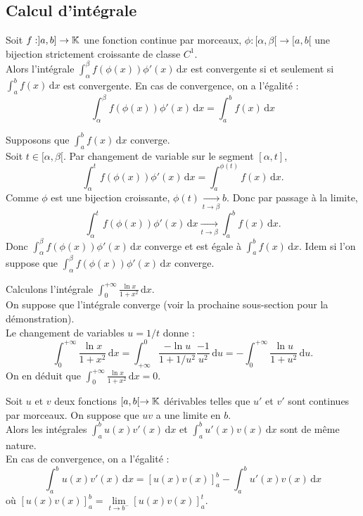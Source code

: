 \documentclass{book}
\begin{document}
\subsection{Calcul d'intégrale}
\begin{Theoreme}
Soit $f:]a,b]\to \mathbb{K} $ une fonction continue par morceaux, $\phi:[\alpha,\beta[\to  [a,b[$ une bijection strictement croissante de classe $C^1$.\\
Alors l'intégrale
$\int_\alpha^\beta f(\phi(x))\phi'(x)\,\mathrm dx $ est convergente si et seulement si $\int_a^b f(x)\,\mathrm dx$ est convergente. En cas de convergence, on a l'égalité :
$$\int_\alpha^\beta f(\phi(x))\phi'(x)\,\mathrm dx =\int_a^b f(x)\,\mathrm dx$$
\end{Theoreme}
\begin{Demonstration}
Supposons que $\int_a^b f(x)\,\mathrm dx$ converge.\\
Soit $t\in[\alpha,\beta[.$ Par changement de variable sur le
segment $[\alpha , t]$, 
$$\int_\alpha^t f(\phi(x))\phi'(x)\,\mathrm dx =\int_a^{\phi(t)} f(x)\,\mathrm dx.$$
Comme $\phi$ est une bijection croissante, $\phi(t )\xrightarrow[t \to \beta]{} b$. Donc par passage à la limite, 
$$\int_\alpha^t f(\phi(x))\phi'(x)\,\mathrm dx\xrightarrow[t \to \beta ]{} \int_a^b f(x)\,\mathrm dx.$$
Donc $\int_\alpha^\beta f(\phi(x))\phi'(x)\,\mathrm dx $ converge et est égale à  $\int_a^b f(x)\,\mathrm dx$.
Idem si l'on suppose que $\int_\alpha^\beta f(\phi(x))\phi'(x)\,\mathrm dx$ converge.
\end{Demonstration}
\begin{Exemple}
Calculons l'intégrale $\int_0^{+\infty}\frac{\ln x}{1+x^2}\,\mathrm dx$.\\
On suppose que l'intégrale converge (voir la prochaine sous-section pour la démonstration).\\
Le changement de variables $u=1/t$ donne :
$$\int^{+\infty }_0 \frac{\ln x}{1+x^2}\,\mathrm dx=\int^{0}_{+\infty } \frac{-\ln u}{1+1/u^2}\frac{-1}{u^2}\,\mathrm du=-\int^{+\infty }_0 \frac{\ln u}{1+u^2}\,\mathrm du.$$
On en déduit que $\int_0^{+\infty}\frac{\ln x}{1+x^2}\,\mathrm dx=0$.
\end{Exemple}
\begin{Theoreme}
Soit $u$ et $v$ deux fonctions $[a,b[ \to\mathbb{K} $ dérivables telles que $u'$ et $v'$ sont continues par morceaux. On suppose que $uv$ a une limite  en $b$.\\
Alors les intégrales $\int_a^b u(x)v'(x)\,\mathrm dx $ et $\int_a^b u'(x)v(x)\,\mathrm dx $ sont de même nature.\\
En cas de convergence, on a l'égalité :
\[ \int_a^b u(x)v'(x)\,\mathrm dx = \left[u(x)v(x)\right]_a^b - \int_a^b u'(x)v(x)\,\mathrm dx \]
où $\left[u(x)v(x)\right]_a^b = \lim\limits_{t \to b^-} \left[ u(x)v(x)\right]_a^t$.\\
\end{Theoreme}
\end{document}
